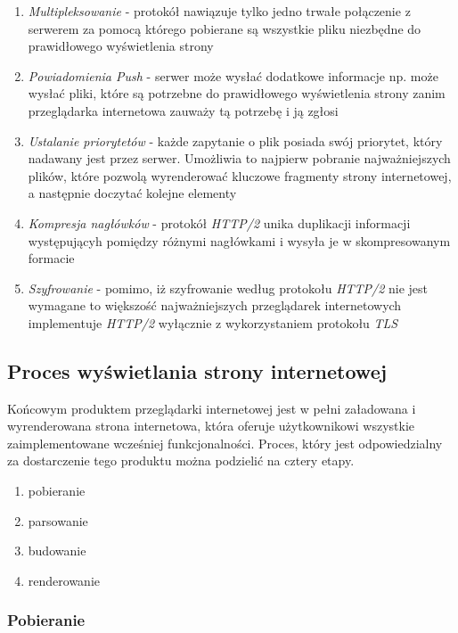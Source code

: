 \documentclass[polish, twoside, 12pt]{mwart}
\begin{document}
\begin{enumerate}
  \item \emph{Multipleksowanie} - protokół nawiązuje tylko jedno trwałe połączenie z serwerem za pomocą którego pobierane są wszystkie pliku niezbędne do prawidłowego wyświetlenia strony
  \item \emph{Powiadomienia Push} - serwer może wysłać dodatkowe informacje np. może wysłać pliki, które są potrzebne do prawidłowego wyświetlenia strony zanim przeglądarka internetowa zauważy tą potrzebę i ją zgłosi
  \item \emph{Ustalanie priorytetów} - każde zapytanie o plik posiada swój priorytet, który nadawany jest przez serwer. Umożliwia to najpierw pobranie najważniejszych plików, które pozwolą wyrenderować kluczowe fragmenty strony internetowej, a następnie doczytać kolejne elementy
  \item \emph{Kompresja nagłówków} - protokół \emph{HTTP/2} unika duplikacji informacji występującyh pomiędzy różnymi nagłówkami i wysyła je w skompresowanym formacie
  \item \emph{Szyfrowanie} - pomimo, iż szyfrowanie według protokołu \emph{HTTP/2} nie jest wymagane to większość najważniejszych przeglądarek internetowych implementuje \emph{HTTP/2} wyłącznie z wykorzystaniem protokołu \emph{TLS}
\end{enumerate}

\subsection{Proces wyświetlania strony internetowej}

Końcowym produktem przeglądarki internetowej jest w pełni załadowana i wyrenderowana strona internetowa, która oferuje użytkownikowi wszystkie zaimplementowane wcześniej funkcjonalności. Proces, który jest odpowiedzialny za dostarczenie tego produktu można podzielić na cztery etapy.

\begin{enumerate}
  \item pobieranie
  \item parsowanie
  \item budowanie
  \item renderowanie
\end{enumerate}

\subsubsection{Pobieranie}
\end{document}
